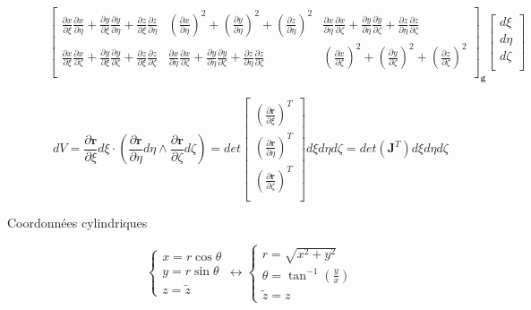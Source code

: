 \documentclass
[
a4paper,                      %
twoside,					  %
12pt,                         %
abstract,		      %
fleqn,                        %
]
{scrartcl} %
\begin{document}
\begin{description}
\begin{equation}
\begin{aligned}
{\begin{bmatrix}
\frac{\partial x}{\partial\xi}\frac{\partial x}{\partial\eta}+\frac{\partial y}{\partial\xi}\frac{\partial y}{\partial\eta}+\frac{\partial z}{\partial\xi}\frac{\partial z}{\partial\eta}&\left(\frac{\partial x}{\partial\eta}\right)^{2}+\left(\frac{\partial y}{\partial\eta}\right)^{2}+\left(\frac{\partial z}{\partial\eta}\right)^{2}&\frac{\partial x}{\partial\eta}\frac{\partial x}{\partial\zeta}+\frac{\partial y}{\partial\eta}\frac{\partial y}{\partial\zeta}+\frac{\partial z}{\partial\eta}\frac{\partial z}{\partial\zeta}\\
\frac{\partial x}{\partial\xi}\frac{\partial x}{\partial\zeta}+\frac{\partial y}{\partial\xi}\frac{\partial y}{\partial\zeta}+\frac{\partial z}{\partial\xi}\frac{\partial z}{\partial\zeta}&\frac{\partial x}{\partial\eta}\frac{\partial x}{\partial\zeta}+\frac{\partial y}{\partial\eta}\frac{\partial y}{\partial\zeta}+\frac{\partial z}{\partial\eta}\frac{\partial z}{\partial\zeta}&\left(\frac{\partial x}{\partial\zeta}\right)^{2}+\left(\frac{\partial y}{\partial\zeta}\right)^{2}+\left(\frac{\partial z}{\partial\zeta}\right)^{2}\\
\end{bmatrix}}_{\mathbf{g}}\begin{bmatrix}
d\xi\\
d\eta\\
d\zeta\\
\end{bmatrix}
\end{aligned}
\end{equation}

\begin{equation}
dV=\frac{\partial \mathbf{r}}{\partial\xi}d\xi\cdot\left(\frac{\partial \mathbf{r}}{\partial\eta}d\eta\wedge\frac{\partial \mathbf{r}}{\partial\zeta}d\zeta\right)=det\begin{bmatrix}
\left(\frac{\partial \mathbf{r}}{\partial\xi}\right)^{T}\\
\left(\frac{\partial \mathbf{r}}{\partial\eta}\right)^{T}\\
\left(\frac{\partial \mathbf{r}}{\partial\zeta}\right)^{T}\\
\end{bmatrix}d\xi d\eta d\zeta=det\left(\mathbf{J}^{T}\right)d\xi d\eta d\zeta
\end{equation}

\newpage

\item[Coordonn\'ees cylindriques]

\begin{equation}
\begin{cases}
x=r\cos{\theta}\\
y=r\sin{\theta}\\
z=\tilde{z}
\end{cases}\longleftrightarrow\begin{cases}
r=\sqrt{x^{2}+y^{2}}\\
\theta=\tan^{-1}\left(\frac{y}{x}\right)\\
\tilde{z}=z
\end{cases}
\end{equation}


\end{description}
\end{document}

